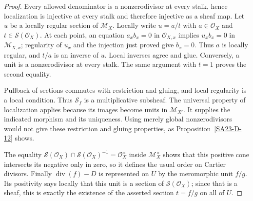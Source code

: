 \begin{proof}
Every allowed denominator is a nonzerodivisor at every
stalk, hence localization is injective at every stalk
and therefore injective as a sheaf map.
Let $u$ be a locally regular section of $\mathcal M_X$.
Locally write $u=a/t$ with
$a\in\mathcal O_X$ and $t\in\mathscr S(\mathcal O_X)$.
At each point, an equation $a_xb_x=0$ in $\mathcal O_{X,x}$
implies $u_xb_x=0$ in $\mathcal M_{X,x}$; regularity of
$u_x$ and the injection just proved give $b_x=0$.
Thus $a$ is locally regular, and $t/a$ is an inverse
of $u$.  Local inverses agree and glue.
Conversely, a unit is a nonzerodivisor at every stalk.
The same argument with $t=1$ proves the second equality.

Pullback of sections commutes with restriction and gluing,
and local regularity is a local condition.  Thus
$\mathscr S_f$ is a multiplicative subsheaf.
The universal property of localization applies because its
images become units in $\mathcal M_{X'}$.
It supplies the indicated morphism and its uniqueness.
Using merely global nonzerodivisors would not give these
restriction and gluing properties, as
Proposition~\ref{SA23-D-12} shows.

The equality
$\mathscr S(\mathcal O_X)\cap
\mathscr S(\mathcal O_X)^{-1}=\mathcal O_X^\times$
inside $\mathcal M_X^\times$ shows that this positive
cone intersects its negative only in zero, so it defines
the usual order on Cartier divisors.
Finally $\operatorname{div}(f)-D$ is represented on $U$
by the meromorphic unit $f/g$.  Its positivity says
locally that this unit is a section of
$\mathscr S(\mathcal O_X)$; since that is a sheaf, this
is exactly the existence of the asserted section
$t=f/g$ on all of $U$.
\end{proof}

